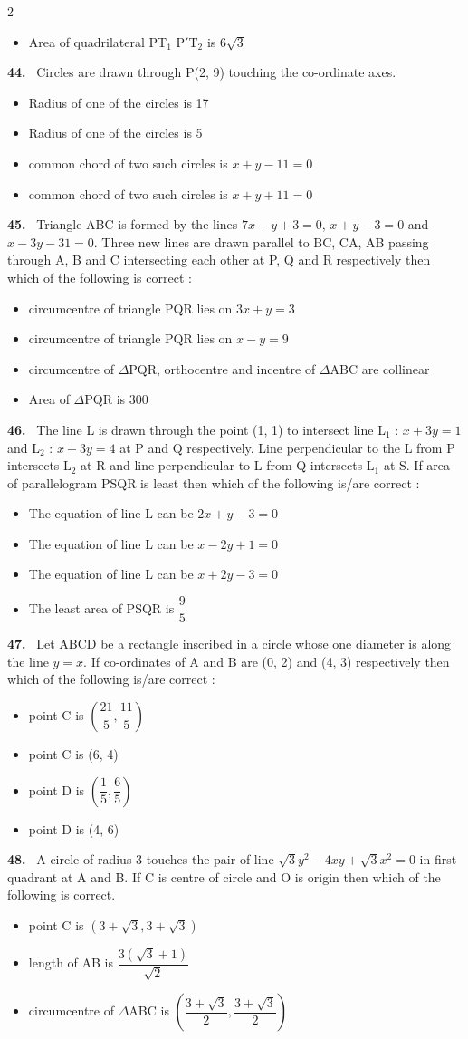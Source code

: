 \documentclass[10pt]{extarticle}
\newcommand{\qn}[1]{\par\smallskip\noindent\textbf{#1.}~}
\newenvironment{qoptions}{\begin{itemize}[leftmargin=1.8em,itemsep=1pt,topsep=2pt,label={}]}{\end{itemize}}
\newcommand{\opt}[2]{\item[(#1)] #2}
\begin{document}
\begin{multicols}{2}
\begin{qoptions}
\opt{D}{Area of quadrilateral PT$_1$ P$'$T$_2$ is $6\sqrt3$}
\end{qoptions}
\qn{44} Circles are drawn through P(2, 9) touching the co-ordinate axes.
\begin{qoptions}
\opt{A}{Radius of one of the circles is 17}
\opt{B}{Radius of one of the circles is 5}
\opt{C}{common chord of two such circles is $x+y-11=0$}
\opt{D}{common chord of two such circles is $x+y+11=0$}
\end{qoptions}
\qn{45} Triangle ABC is formed by the lines $7x-y+3=0$, $x+y-3=0$ and $x-3y-31=0$. Three new lines are drawn parallel to BC, CA, AB passing through A, B and C intersecting each other at P, Q and R respectively then which of the following is correct :
\begin{qoptions}
\opt{A}{circumcentre of triangle PQR lies on $3x+y=3$}
\opt{B}{circumcentre of triangle PQR lies on $x-y=9$}
\opt{C}{circumcentre of $\Delta$PQR, orthocentre and incentre of $\Delta$ABC are collinear}
\opt{D}{Area of $\Delta$PQR is 300}
\end{qoptions}
\qn{46} The line L is drawn through the point (1, 1) to intersect line L$_1$ : $x+3y=1$ and L$_2$ : $x+3y=4$ at P and Q respectively. Line perpendicular to the L from P intersects L$_2$ at R and line perpendicular to L from Q intersects L$_1$ at S. If area of parallelogram PSQR is least then which of the following is/are correct :
\begin{qoptions}
\opt{A}{The equation of line L can be $2x+y-3=0$}
\opt{B}{The equation of line L can be $x-2y+1=0$}
\opt{C}{The equation of line L can be $x+2y-3=0$}
\opt{D}{The least area of PSQR is $\dfrac95$}
\end{qoptions}
\qn{47} Let ABCD be a rectangle inscribed in a circle whose one diameter is along the line $y=x$. If co-ordinates of A and B are (0, 2) and (4, 3) respectively then which of the following is/are correct :
\begin{qoptions}
\opt{A}{point C is $\left(\dfrac{21}5,\dfrac{11}5\right)$}
\opt{B}{point C is (6, 4)}
\opt{C}{point D is $\left(\dfrac15,\dfrac65\right)$}
\opt{D}{point D is (4, 6)}
\end{qoptions}
\qn{48} A circle of radius 3 touches the pair of line $\sqrt3y^2-4xy+\sqrt3x^2=0$ in first quadrant at A and B. If C is centre of circle and O is origin then which of the following is correct.
\begin{qoptions}
\opt{A}{point C is $\left(3+\sqrt3,3+\sqrt3\right)$}
\opt{B}{length of AB is $\dfrac{3(\sqrt3+1)}{\sqrt2}$}
\opt{C}{circumcentre of $\Delta$ABC is $\left(\dfrac{3+\sqrt3}2,\dfrac{3+\sqrt3}2\right)$}

\end{qoptions}
\end{multicols}
\end{document}
